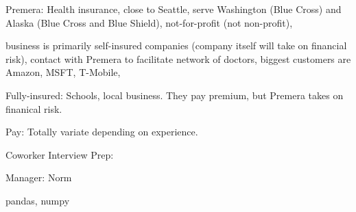 Premera: Health insurance, close to Seattle, serve Washington (Blue Cross) and
Alaska (Blue Cross and Blue Shield), not-for-profit (not non-profit), 

business
is primarily self-insured companies (company itself will take on financial
risk), contact with Premera to facilitate network of doctors, biggest customers
are Amazon, MSFT, T-Mobile,

Fully-insured: Schools, local business. They pay premium, but Premera takes on
finanical risk.

Pay: Totally variate depending on experience.

Coworker Interview Prep: 

Manager: Norm

pandas, numpy
